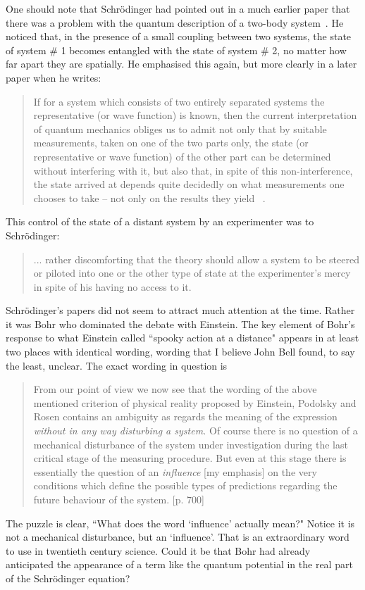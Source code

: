\documentclass[11pt]{article}
\begin{document}
 One should note that Schr\"{o}dinger had pointed out in a much earlier paper that there was a problem with the quantum description of a two-body system~\cite{es27}.  
 He noticed that, in the presence of a small coupling between two systems, the state of system \# 1 becomes entangled with the state of system \# 2, no matter how far apart they are spatially.  He emphasised this again, but more clearly in a later paper  when he writes:
 \begin{quote}
 If for a system which consists of two entirely separated systems the representative (or wave function) is known, then the current interpretation of quantum mechanics obliges us to admit not only that by suitable measurements, taken on one of the two parts only, the state (or representative or wave function) of the other part can be determined without interfering with it, but also that, in spite of this non-interference, the state arrived at depends quite decidedly on what measurements one chooses to take -- not only on the results they yield~\cite{es36} .
 \end{quote}
 This control  of the state of a distant system by an experimenter was to Schr\"{o}dinger: 
 \begin{quote}
 ... rather discomforting that the theory should allow a system to be steered or piloted into one or the other type of state at the experimenter's mercy in spite of his having no access to it. 
 \end{quote}
 Schr\"{o}dinger's papers did not seem to attract much attention at the time.  Rather it was Bohr who dominated the debate with Einstein.  The key element of Bohr's response to what Einstein called ``spooky action at a distance" appears in at least two places with identical wording, wording that I believe John Bell found, to say the least, unclear.  The exact wording in question is
 \begin{quote}  
 From our point of view we now see that the wording of the above mentioned criterion of physical reality proposed by Einstein, Podolsky and Rosen contains an ambiguity as regards the meaning of the expression {\em without in any way disturbing a system.}  Of course there is no question of a mechanical disturbance of the system under investigation during the last critical stage of the measuring procedure.  But even at this stage there is essentially the question of an {\em influence} [my emphasis] on the very conditions which define the possible types of predictions regarding the future behaviour of the system.\cite{nb35} [p. 700]
 \end{quote}
 The puzzle is clear, ``What does the word `influence' actually mean?" Notice it is not a mechanical disturbance, but an `influence'.  That is an extraordinary word to use in twentieth century science.   
Could it be that Bohr had already anticipated the appearance of a term like the quantum potential in the real part of the Schr\"{o}dinger equation?  
\end{document}
